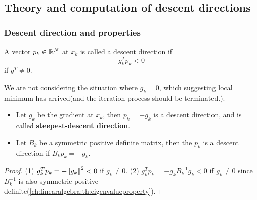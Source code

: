 \begin{refsection}
\subsection{Theory and computation of descent directions}
\subsubsection{Descent direction and properties}
\begin{definition}
A vector $p_k\in \mathbb{R}^N$ at $x_k$ is called a descent direction if $$g^T_k p_k < 0$$ if $g^T\neq 0$.  
\end{definition}

\begin{remark}
We are not considering the situation where $g_k = 0$, which suggesting local minimum has arrived(and the iteration process should be terminated.).	
\end{remark}

\begin{lemma}\hfill
\begin{itemize}
	\item Let $g_k$ be the gradient at $x_k$, then $p_k = -g_k$ is a descent direction, and is called \textbf{steepest-descent direction}.
	\item Let $B_k$ be a symmetric positive definite matrix, then the $p_k$ is a descent direction if $B_kp_k = -g_k$. 
\end{itemize}
\end{lemma}
\begin{proof}
(1) $g_k^Tp_k = -\norm{g_k}^2 < 0$ if $g_k\neq 0$. 
(2) $g_k^Tp_k = - g_k B_k^{-1} g_k <0$ if $g_k \neq 0$ since $B_k^{-1}$ is also symmetric positive definite(\autoref{ch:linearalgebra:th:eigenvalueproperty}).
\end{proof}



\end{refsection}
